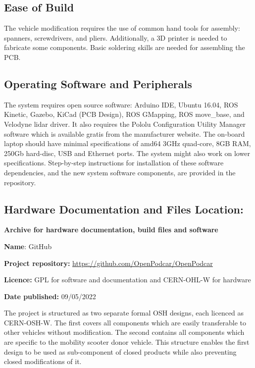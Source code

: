 \documentclass[a4paper]{article}
\begin{document}
	\subsection{Ease of Build}\label{h.wg823sgyb1e4}
	
	The vehicle modification requires the use of common hand tools for assembly: spanners, screwdrivers, and pliers. Additionally, a 3D printer is needed to fabricate some components. Basic soldering skills are needed for assembling the PCB. 
	
	\subsection{Operating Software and Peripherals}\label{h.uz77dixfh5i4}
	
	The system requires open source software: Arduino IDE, Ubuntu 16.04, ROS Kinetic, Gazebo, KiCad (PCB Design), ROS GMapping, ROS move\_base, and Velodyne lidar driver. It also requires the Pololu Configuration Utility Manager software which is available gratis from the manufacturer website. The on-board laptop should have minimal specifications of amd64 3GHz quad-core, 8GB RAM, 250Gb hard-disc, USB and Ethernet ports. The system might also work on lower specifications. Step-by-step instructions for installation of these software dependencies, and the new system software components, are provided in the repository.
	
	\subsection{Hardware Documentation and Files Location:}\label{h.nbisrsde6sc3}
	
	\textbf{Archive for hardware documentation, build files and software}
	
	\textbf{Name}: GitHub
	
	
	\textbf{Project repository:} \url{https://github.com/OpenPodcar/OpenPodcar}
	
	\textbf{Licence:} GPL for software and documentation and CERN-OHL-W for hardware
	
	\textbf{Date published:} 09/05/2022
	
	The project is structured as two separate formal OSH designs, each licenced as CERN-OSH-W. The first covers all components which are easily transferable to other vehicles without modification. The second contains all components which are specific to the mobility scooter donor vehicle. This structure enables the first design to be used as sub-component of closed products while also preventing closed modifications of it.
	
\end{document}
